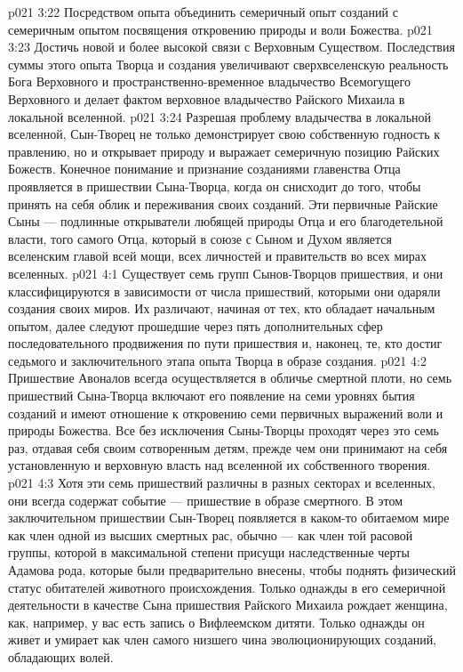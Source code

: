 \vs p021 3:22 \bibnobreakspace Посредством опыта объединить семеричный опыт созданий с семеричным опытом посвящения откровению природы и воли Божества.
\vs p021 3:23 \bibnobreakspace Достичь новой и более высокой связи с Верховным Существом. Последствия суммы этого опыта Творца и создания увеличивают сверхвселенскую реальность Бога Верховного и пространственно\hyp{}временное владычество Всемогущего Верховного и делает фактом верховное владычество Райского Михаила в локальной вселенной.
\vs p021 3:24 \pc Разрешая проблему владычества в локальной вселенной, Сын\hyp{}Творец не только демонстрирует свою собственную годность к правлению, но и открывает природу и выражает семеричную позицию Райских Божеств. Конечное понимание и признание созданиями главенства Отца проявляется в пришествии Сына\hyp{}Творца, когда он снисходит до того, чтобы принять на себя облик и переживания своих созданий. Эти первичные Райские Сыны --- подлинные открыватели любящей природы Отца и его благодетельной власти, того самого Отца, который в союзе с Сыном и Духом является вселенским главой всей мощи, всех личностей и правительств во всех мирах вселенных.
\vs p021 4:1 Существует семь групп Сынов\hyp{}Творцов пришествия, и они классифицируются в зависимости от числа пришествий, которыми они одаряли создания своих миров. Их различают, начиная от тех, кто обладает начальным опытом, далее следуют прошедшие через пять дополнительных сфер последовательного продвижения по пути пришествия и, наконец, те, кто достиг седьмого и заключительного этапа опыта Творца в образе создания.
\vs p021 4:2 Пришествие Авоналов всегда осуществляется в обличье смертной плоти, но семь пришествий Сына\hyp{}Творца включают его появление на семи уровнях бытия созданий и имеют отношение к откровению семи первичных выражений воли и природы Божества. Все без исключения Сыны\hyp{}Творцы проходят через это семь раз, отдавая себя своим сотворенным детям, прежде чем они принимают на себя установленную и верховную власть над вселенной их собственного творения.
\vs p021 4:3 Хотя эти семь пришествий различны в разных секторах и вселенных, они всегда содержат событие --- пришествие в образе смертного. В этом заключительном пришествии Сын\hyp{}Творец появляется в каком\hyp{}то обитаемом мире как член одной из высших смертных рас, обычно --- как член той расовой группы, которой в максимальной степени присущи наследственные черты Адамова рода, которые были предварительно внесены, чтобы поднять физический статус обитателей животного происхождения. Только однажды в его семеричной деятельности в качестве Сына пришествия Райского Михаила рождает женщина, как, например, у вас есть запись о Вифлеемском дитяти. Только однажды он живет и умирает как член самого низшего чина эволюционирующих созданий, обладающих волей.
